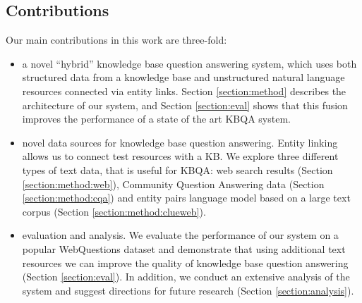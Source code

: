 \subsection{Contributions}

Our main contributions in this work are three-fold:
\begin{itemize}
\item a novel ``hybrid'' knowledge base question answering system, which uses both structured data from a knowledge base and unstructured natural language resources connected via entity links. Section \ref{section:method} describes the architecture of our system, and Section \ref{section:eval} shows that this fusion improves the performance of a state of the art KBQA system.
\item novel data sources for knowledge base question answering. Entity linking allows us to connect test resources with a KB. We explore three different types of text data, that is useful for KBQA: web search results (Section \ref{section:method:web}), Community Question Answering data (Section \ref{section:method:cqa}) and entity pairs language model based on a large text corpus (Section \ref{section:method:clueweb}).
\item evaluation and analysis. We evaluate the performance of our system on a popular WebQuestions dataset and demonstrate that using additional text resources we can improve the quality of knowledge base question answering (Section \ref{section:eval}). In addition, we conduct an extensive analysis of the system and suggest directions for future research (Section \ref{section:analysis}).
\end{itemize}



